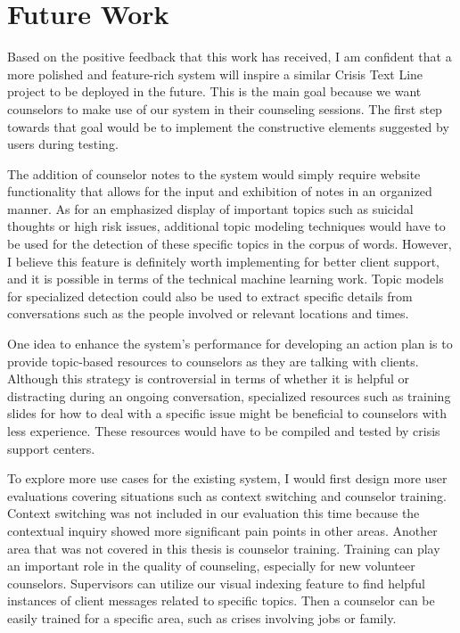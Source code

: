 \chapter{Future Work}

Based on the positive feedback that this work has received, I am confident that a
more polished and feature-rich system will inspire a similar Crisis Text Line project
to be deployed in the future. This is the main goal because we want counselors to
make use of our system in their counseling sessions. The first step towards that goal
would be to implement the constructive elements suggested by users during testing.

The addition of counselor notes to the system would simply require website
functionality that allows for the input and exhibition of notes in an organized manner.
As for an emphasized display of important topics such as suicidal thoughts or high
risk issues, additional topic modeling techniques would have to be used for the
detection of these specific topics in the corpus of words. However, I believe this feature
is definitely worth implementing for better client support, and it is possible in terms
of the technical machine learning work. Topic models for specialized detection could
also be used to extract specific details from conversations such as the people involved
or relevant locations and times.

One idea to enhance the system's performance for developing an action plan is to
provide topic-based resources to counselors as they are talking with clients. Although
this strategy is controversial in terms of whether it is helpful or distracting during
an ongoing conversation, specialized resources such as training slides for how to deal
with a specific issue might be beneficial to counselors with less experience. These
resources would have to be compiled and tested by crisis support centers.

To explore more use cases for the existing system, I would first design more user
evaluations covering situations such as context switching and counselor training.
Context switching was not included in our evaluation this time because the contextual
inquiry showed more significant pain points in other areas. Another area that was
not covered in this thesis is counselor training. Training can play an important role
in the quality of counseling, especially for new volunteer counselors. Supervisors can
utilize our visual indexing feature to find helpful instances of client messages related
to specific topics. Then a counselor can be easily trained for a specific area, such as
crises involving jobs or family.

